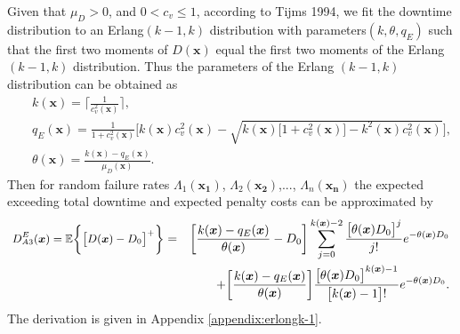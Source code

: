 \documentclass[preprint,12pt]{elsarticle}
\begin{document}
\normalsize
Given that $\mu_{D}>0$, and $0<c_{v}\leq 1$, according to Tijms 1994, we fit the downtime distribution to an Erlang$(k-1,k)$ distribution with parameters$(k,\theta,q_{E})$ such that the first two moments of $D(\boldsymbol{x})$ equal the first two moments of the Erlang $(k-1,k)$ distribution. Thus the parameters of the Erlang $(k-1,k)$ distribution can be obtained as
\small
\begin{eqnarray}
&&k(\boldsymbol{x}) = \lceil \frac{1}{c_{v}^{2}(\boldsymbol{x})} \rceil, \label{k1}\\
&&q_{E}(\boldsymbol{x})= \frac{1}{1+c^{2}_{v}(\boldsymbol{x})}\bigg[k(\boldsymbol{x})c^{2}_{v}(\boldsymbol{x})-\sqrt{k(\boldsymbol{x})\big[1+c^{2}_{v}(\boldsymbol{x})\big]-k^{2}(\boldsymbol{x})c^{2}_{v}(\boldsymbol{x})} \bigg], \label{q1}\\
&&\theta(\boldsymbol{x}) = \frac{k(\boldsymbol{x})-q_{E}(\boldsymbol{x})}{\mu_{D}(\boldsymbol{x})}. \label{theta1}
\end{eqnarray}
\normalsize
Then for random failure rates $\Lambda_{1}(\boldsymbol{x_{1}})$, $\Lambda_{2}(\boldsymbol{x_{2}})$,..., $\Lambda_{n}(\boldsymbol{x_{n}})$ the expected exceeding total downtime and expected penalty costs can be approximated by
\begin{eqnarray}
\small
D_{A3}^{E}(\boldsymbol{x})=\mathbb{E}\bigg\{\big[D(\boldsymbol{x})-D_{0}\big]^{+}\bigg\}
&=&\bigg[\frac{k(\boldsymbol{x})-q_{E}(\boldsymbol{x})}{\theta(\boldsymbol{x})}-D_{0}\bigg]\sum_{j=0}^{k(\boldsymbol{x})-2}{\frac{\big[\theta(\boldsymbol{x}) D_{0}\big]^j}{j!}e^{-\theta(\boldsymbol{x})D_{0}}}\nonumber\\
&&+\bigg[\frac{k(\boldsymbol{x})-q_{E}(\boldsymbol{x})}{\theta(\boldsymbol{x})}\bigg]\frac{\big[\theta(\boldsymbol{x})D_{0}\big]^{k(\boldsymbol{x})-1}}{\big[k(\boldsymbol{x})-1\big]!}e^{-\theta(\boldsymbol{x})D_{0}}.
\label{EXD1}
\end{eqnarray}
\normalsize
The derivation is given in Appendix \ref{appendix:erlongk-1}.
\end{document}
